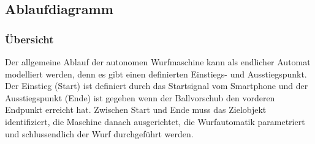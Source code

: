 \subsection{Ablaufdiagramm}

\subsubsection{Übersicht}
Der allgemeine Ablauf der autonomen Wurfmaschine kann als endlicher Automat
modelliert werden, denn es gibt einen definierten Einstiegs- und 
Ausstiegspunkt. Der Einstieg (Start) ist definiert durch das Startsignal vom Smartphone und der Ausstiegspunkt (Ende) ist gegeben wenn der Ballvorschub den vorderen Endpunkt erreicht hat. Zwischen Start und Ende muss das Zielobjekt
identifiziert, die Maschine danach ausgerichtet, die Wurfautomatik
parametriert und schlussendlich der Wurf durchgeführt werden.



